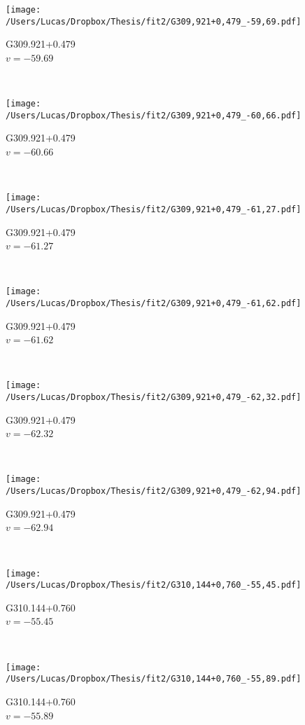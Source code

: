 \begin{figure*}[t]\ContinuedFloat
	\centering
	\begin{subfigure}[t]{0.3\textwidth}
		\texttt{[image: /Users/Lucas/Dropbox/Thesis/fit2/G309,921+0,479\_-59,69.pdf]}
		\caption[]{G309.921+0.479\\$v=-59.69$\,\kms}
	\end{subfigure}
	~
	\begin{subfigure}[t]{0.3\textwidth}
		\texttt{[image: /Users/Lucas/Dropbox/Thesis/fit2/G309,921+0,479\_-60,66.pdf]}
		\caption[]{G309.921+0.479\\$v=-60.66$\,\kms}
	\end{subfigure}
	~
	\begin{subfigure}[t]{0.3\textwidth}
		\texttt{[image: /Users/Lucas/Dropbox/Thesis/fit2/G309,921+0,479\_-61,27.pdf]}
		\caption[]{G309.921+0.479\\$v=-61.27$\,\kms}
	\end{subfigure}
	~
	\begin{subfigure}[t]{0.3\textwidth}
		\texttt{[image: /Users/Lucas/Dropbox/Thesis/fit2/G309,921+0,479\_-61,62.pdf]}
		\caption[]{G309.921+0.479\\$v=-61.62$\,\kms}
	\end{subfigure}
	~
	\begin{subfigure}[t]{0.3\textwidth}
		\texttt{[image: /Users/Lucas/Dropbox/Thesis/fit2/G309,921+0,479\_-62,32.pdf]}
		\caption[]{G309.921+0.479\\$v=-62.32$\,\kms}
	\end{subfigure}
	~
	\begin{subfigure}[t]{0.3\textwidth}
		\texttt{[image: /Users/Lucas/Dropbox/Thesis/fit2/G309,921+0,479\_-62,94.pdf]}
		\caption[]{G309.921+0.479\\$v=-62.94$\,\kms}
	\end{subfigure}
	~
	\begin{subfigure}[t]{0.3\textwidth}
		\texttt{[image: /Users/Lucas/Dropbox/Thesis/fit2/G310,144+0,760\_-55,45.pdf]}
		\caption[]{G310.144+0.760\\$v=-55.45$\,\kms}
	\end{subfigure}
	~
	\begin{subfigure}[t]{0.3\textwidth}
		\texttt{[image: /Users/Lucas/Dropbox/Thesis/fit2/G310,144+0,760\_-55,89.pdf]}
		\caption[]{G310.144+0.760\\$v=-55.89$\,\kms}

\end{subfigure}
\end{figure*}
